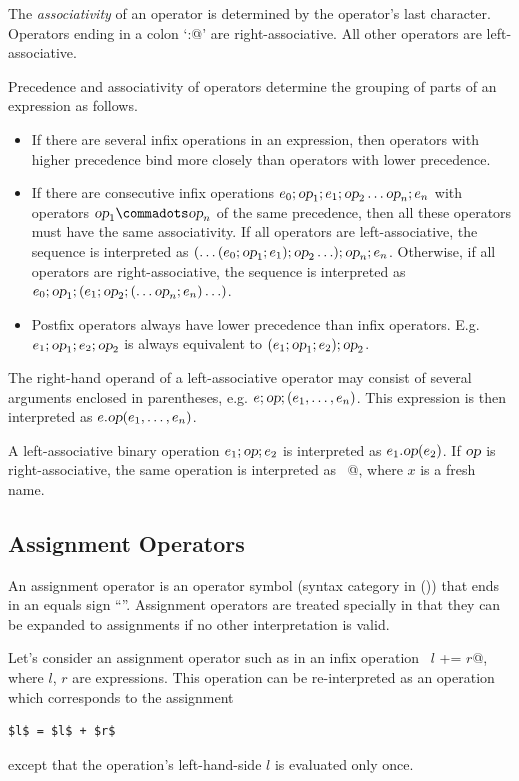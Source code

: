 The {\em associativity} of an operator is determined by the operator's
last character.  Operators ending in a colon `\lstinline@:@' are
right-associative. All other operators are left-associative.

Precedence and associativity of operators determine the grouping of
parts of an expression as follows.
\begin{itemize}
\item If there are several infix operations in an
expression, then operators with higher precedence bind more closely
than operators with lower precedence.
\item If there are consecutive infix
operations $e_0; \mbox{\sl op}_1; e_1; \mbox{\sl op}_2 \ldots \mbox{\sl op}_n; e_n$ 
with operators $\op_1 \commadots \op_n$ of the same precedence, 
then all these operators must
have the same associativity. If all operators are left-associative,
the sequence is interpreted as
$(\ldots(e_0;\mbox{\sl op}_1;e_1);\mbox{\sl op}_2\ldots);\mbox{\sl op}_n;e_n$. 
Otherwise, if all operators are right-associative, the
sequence is interpreted as
$e_0;\mbox{\sl op}_1;(e_1;\mbox{\sl op}_2;(\ldots \mbox{\sl op}_n;e_n)\ldots)$.
\item
Postfix operators always have lower precedence than infix
operators. E.g.\ $e_1;\mbox{\sl op}_1;e_2;\mbox{\sl op}_2$ is always equivalent to
$(e_1;\mbox{\sl op}_1;e_2);\mbox{\sl op}_2$.
\end{itemize}
The right-hand operand of a left-associative operator may consist of
several arguments enclosed in parentheses, e.g. $e;\mbox{\sl op};(e_1,\ldots,e_n)$.
This expression is then interpreted as $e.\mbox{\sl op}(e_1,\ldots,e_n)$.

A left-associative binary
operation $e_1;\mbox{\sl op};e_2$ is interpreted as $e_1.\mbox{\sl op}(e_2)$. If $\mbox{\sl op}$ is
right-associative, the same operation is interpreted as
~@, where $x$ is a fresh
name. 

\subsection{Assignment Operators} \label{sec:assops}

An assignment operator is an operator symbol (syntax category
\lstinline@op@ in ()) that ends in an equals sign
``\code{=}''. Assignment operators are treated specially in that they
can be expanded to assignments if no other interpretation is valid.

Let's consider an assignment operator such as \code{+=} in an infix
operation ~\lstinline@$l$ += $r$@, where $l$, $r$ are expressions.  
This operation can be re-interpreted as an operation which corresponds 
to the assignment
\begin{lstlisting}
$l$ = $l$ + $r$
\end{lstlisting}
except that the operation's left-hand-side $l$ is evaluated only once.

